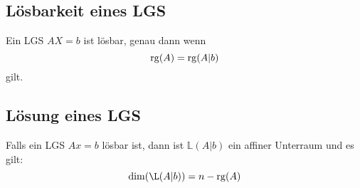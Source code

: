 \subsection{Lösbarkeit eines LGS}
Ein LGS $AX = b$ ist lösbar, genau dann wenn
\begin{equation*}
    \operatorname{rg}(A) = \operatorname{rg}(A\vert b)
\end{equation*}
gilt.

\subsection{Lösung eines LGS}
Falls ein LGS $Ax = b$ lösbar ist, dann ist $\mathbb{L}(A\vert b)$ ein affiner
Unterraum und es gilt:
\begin{equation*}
    \dim(\L(A\vert b)) = n - \rg(A)
\end{equation*}
